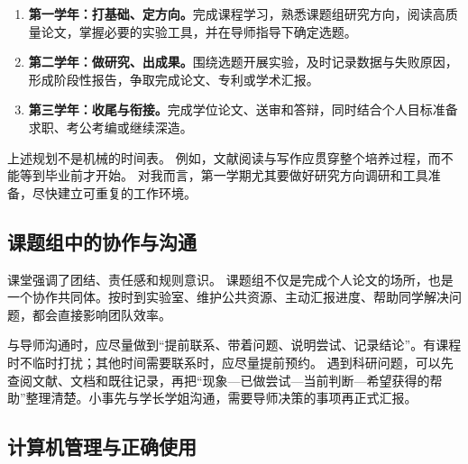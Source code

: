 \documentclass[UTF8,zihao=-4,a4paper,fontset=windows]{ctexart}
\begin{document}
\begin{enumerate}
  \item \textbf{第一学年：打基础、定方向。}完成课程学习，熟悉课题组研究方向，阅读高质量论文，掌握必要的实验工具，并在导师指导下确定选题。
  \item \textbf{第二学年：做研究、出成果。}围绕选题开展实验，及时记录数据与失败原因，形成阶段性报告，争取完成论文、专利或学术汇报。
  \item \textbf{第三学年：收尾与衔接。}完成学位论文、送审和答辩，同时结合个人目标准备求职、考公考编或继续深造。
\end{enumerate}

\begin{center}
\end{center}

上述规划不是机械的时间表。
例如，文献阅读与写作应贯穿整个培养过程，而不能等到毕业前才开始。
对我而言，第一学期尤其要做好研究方向调研和工具准备，尽快建立可重复的工作环境。

\subsection{课题组中的协作与沟通}

课堂强调了团结、责任感和规则意识。
课题组不仅是完成个人论文的场所，也是一个协作共同体。按时到实验室、维护公共资源、主动汇报进度、帮助同学解决问题，都会直接影响团队效率。

与导师沟通时，应尽量做到“提前联系、带着问题、说明尝试、记录结论”。有课程时不临时打扰；其他时间需要联系时，应尽量提前预约。
遇到科研问题，可以先查阅文献、文档和既往记录，再把“现象—已做尝试—当前判断—希望获得的帮助”整理清楚。小事先与学长学姐沟通，需要导师决策的事项再正式汇报。

\subsection{计算机管理与正确使用}
\end{document}
